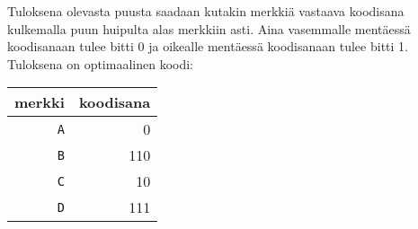 Tuloksena olevasta puusta saadaan kutakin merkkiä vastaava
koodisana kulkemalla puun huipulta alas merkkiin asti.
Aina vasemmalle mentäessä koodisanaan tulee bitti 0
ja oikealle mentäessä koodisanaan tulee bitti 1.
Tuloksena on optimaalinen koodi:
\begin{center}
\begin{tabular}{rr}
merkki & koodisana \\
\hline
\texttt{A} & 0 \\
\texttt{B} & 110 \\
\texttt{C} & 10 \\
\texttt{D} & 111 \\
\end{tabular}
\end{center}
